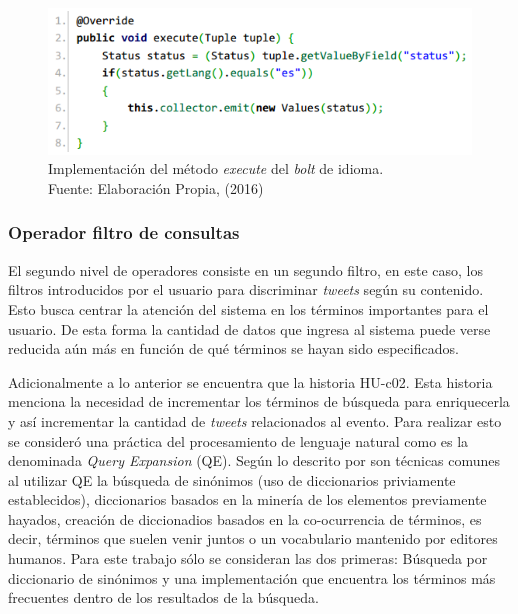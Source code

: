 \begin{figure}[H]
	\centering
	\captionsetup{justification=centering}
	\includegraphics[scale=0.8]{images/LanguageBoltExecute.png}
	\caption[Implementación del método \textit{execute} del \textit{bolt} de idioma.]{Implementación del método \textit{execute} del \textit{bolt} de idioma.\\Fuente: Elaboración Propia, (2016)}
	\label{fig:operadorIdioma}
\end{figure}

\subsubsection*{Operador filtro de consultas}
\label{subsubsec:2op}

El segundo nivel de operadores consiste en un segundo filtro, en este caso, los filtros introducidos por el usuario para discriminar \textit{tweets} según su contenido. Esto busca centrar la atención del sistema en los términos importantes para el usuario. De esta forma la cantidad de datos que ingresa al sistema puede verse reducida aún más en función de qué términos se hayan sido especificados.

Adicionalmente a lo anterior se encuentra que la historia HU-c02. Esta historia menciona la necesidad de incrementar los términos de búsqueda para enriquecerla y así incrementar la cantidad de \textit{tweets} relacionados al evento. Para realizar esto se consideró una práctica del procesamiento de lenguaje natural como es la denominada \textit{Query Expansion} (QE). Según lo descrito por \citep{IRQE} son técnicas comunes al utilizar QE la búsqueda de sinónimos (uso de diccionarios priviamente establecidos), diccionarios basados en la minería de los elementos previamente hayados, creación de diccionadios basados en la co-ocurrencia de términos, es decir, términos que suelen venir juntos o un vocabulario mantenido por editores humanos. Para este trabajo sólo se consideran las dos primeras: Búsqueda por diccionario de sinónimos y una implementación que encuentra los términos más frecuentes dentro de los resultados de la búsqueda.

